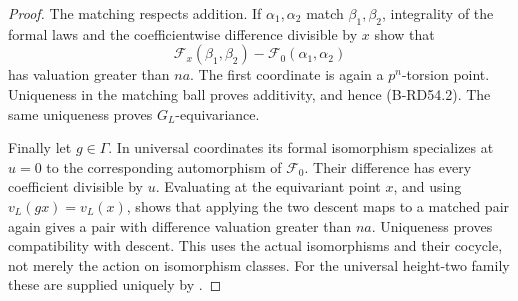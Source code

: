\begin{proof}
The matching respects addition. If $\alpha_1,\alpha_2$ match
$\beta_1,\beta_2$, integrality of the formal laws and the
coefficientwise difference divisible by $x$ show that
\[
 \mathcal F_x(\beta_1,\beta_2)
       -\mathcal F_0(\alpha_1,\alpha_2)
\]
has valuation greater than $na$. The first coordinate is again
a $p^n$-torsion point. Uniqueness in the matching ball proves
additivity, and hence (B-RD54.2). The same uniqueness proves
$G_L$-equivariance.

Finally let $g\in\Gamma$. In universal coordinates its formal
isomorphism specializes at $u=0$ to the corresponding automorphism
of $\mathcal F_0$. Their difference has every coefficient
divisible by $u$. Evaluating at the equivariant point $x$,
and using $v_L(gx)=v_L(x)$, shows that applying the two descent
maps to a matched pair again gives a pair with difference
valuation greater than $na$. Uniqueness proves compatibility
with descent. This uses the actual isomorphisms and their
cocycle, not merely the action on isomorphism classes. For the
universal height-two family these are supplied uniquely by
\cite[Propositions~14.7 and~14.9, including (14.8)--(14.10)]
{HopkinsGross1994Bundles}.
\end{proof}

